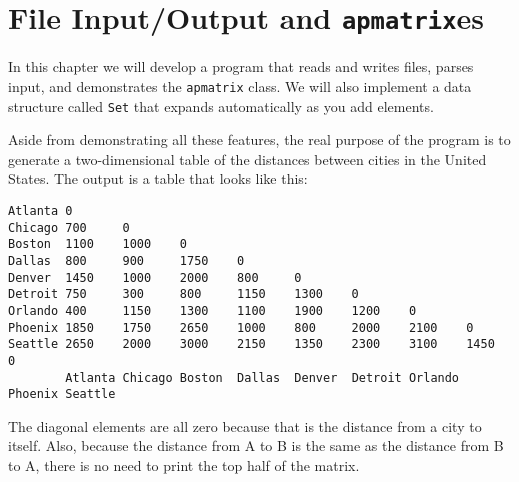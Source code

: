





\chapter{File Input/Output and {\tt apmatrix}es}

In this chapter we will develop a program that reads and writes files,
parses input, and demonstrates the {\tt apmatrix} class.  We will also
implement a data structure called {\tt Set} that expands automatically
as you add elements.

Aside from demonstrating all these features, the real purpose of the
program is to generate a two-dimensional table of
the distances between cities in the United States.
The output is a table that looks like this:

\begin{verbatim}
Atlanta 0
Chicago 700     0
Boston  1100    1000    0
Dallas  800     900     1750    0
Denver  1450    1000    2000    800     0
Detroit 750     300     800     1150    1300    0
Orlando 400     1150    1300    1100    1900    1200    0
Phoenix 1850    1750    2650    1000    800     2000    2100    0
Seattle 2650    2000    3000    2150    1350    2300    3100    1450    0
        Atlanta Chicago Boston  Dallas  Denver  Detroit Orlando Phoenix Seattle
\end{verbatim}
%
The diagonal elements are all zero because that is the distance
from a city to itself.  Also, because
the distance from A to B is the same as the distance from B
to A, there is no need to print the top half of the matrix.

